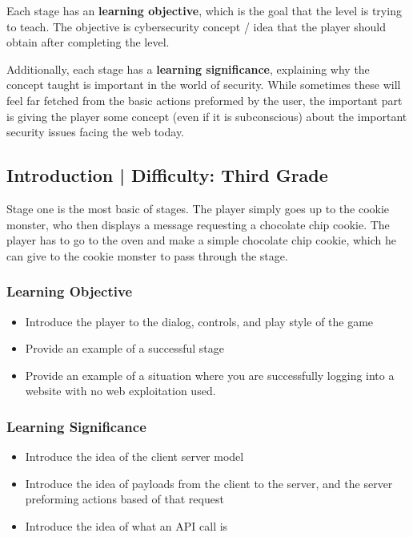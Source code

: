 \documentclass{article}
\begin{document}
Each stage has an \textbf{learning objective}, which is the goal that
the level is trying to teach. The objective is cybersecurity concept /
idea that the player should obtain after completing the level.

Additionally, each stage has a \textbf{learning significance},
explaining why the concept taught is important in the world of
security. While sometimes these will feel far fetched from the basic
actions preformed by the user, the important part is giving the player
some concept (even if it is subconscious) about the important security
issues facing the web today.

\subsection{Introduction | Difficulty: Third Grade}

Stage one is the most basic of stages. The player simply goes up to
the cookie monster, who then displays a message requesting a chocolate
chip cookie. The player has to go to the oven and make a simple
chocolate chip cookie, which he can give to the cookie monster to pass
through the stage.

\subsubsection{Learning Objective}

\begin{itemize}

  \item Introduce the player to the dialog, controls, and play style of
the game
  \item Provide an example of a successful stage
  \item Provide an example of a situation where you are successfully
logging into a website with no web exploitation used.
\end{itemize}

\subsubsection{Learning Significance}

\begin{itemize}
  \item Introduce the idea of the client server model
  \item Introduce the idea of payloads from the client to the server,
    and the server preforming actions based of that request
  \item Introduce the idea of what an API call is
\end{itemize}
\end{document}
